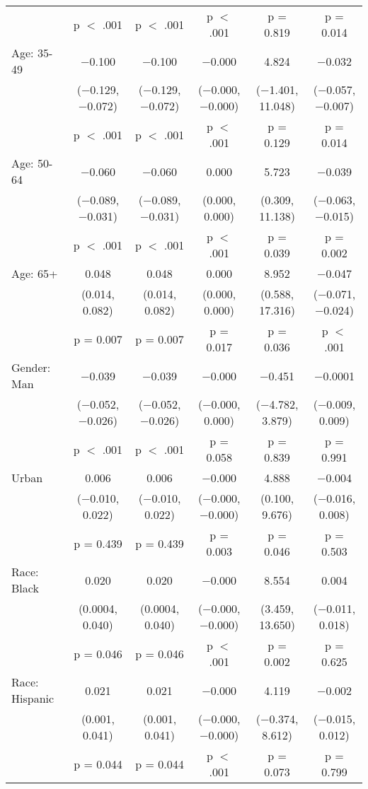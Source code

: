 \begin{tabular}{@{\extracolsep{5pt}}lccccc}
  & p $<$ .001 & p $<$ .001 & p $<$ .001 & p = 0.819 & p = 0.014 \\ 
  Age: 35\mbox{-}49 & $-$0.100 & $-$0.100 & $-$0.000 & 4.824 & $-$0.032 \\ 
  & ($-$0.129, $-$0.072) & ($-$0.129, $-$0.072) & ($-$0.000, $-$0.000) & ($-$1.401, 11.048) & ($-$0.057, $-$0.007) \\ 
  & p $<$ .001 & p $<$ .001 & p $<$ .001 & p = 0.129 & p = 0.014 \\ 
  Age: 50\mbox{-}64 & $-$0.060 & $-$0.060 & 0.000 & 5.723 & $-$0.039 \\ 
  & ($-$0.089, $-$0.031) & ($-$0.089, $-$0.031) & (0.000, 0.000) & (0.309, 11.138) & ($-$0.063, $-$0.015) \\ 
  & p $<$ .001 & p $<$ .001 & p $<$ .001 & p = 0.039 & p = 0.002 \\ 
  Age: 65+ & 0.048 & 0.048 & 0.000 & 8.952 & $-$0.047 \\ 
  & (0.014, 0.082) & (0.014, 0.082) & (0.000, 0.000) & (0.588, 17.316) & ($-$0.071, $-$0.024) \\ 
  & p = 0.007 & p = 0.007 & p = 0.017 & p = 0.036 & p $<$ .001 \\ 
  Gender: Man & $-$0.039 & $-$0.039 & $-$0.000 & $-$0.451 & $-$0.0001 \\ 
  & ($-$0.052, $-$0.026) & ($-$0.052, $-$0.026) & ($-$0.000, 0.000) & ($-$4.782, 3.879) & ($-$0.009, 0.009) \\ 
  & p $<$ .001 & p $<$ .001 & p = 0.058 & p = 0.839 & p = 0.991 \\ 
  Urban & 0.006 & 0.006 & $-$0.000 & 4.888 & $-$0.004 \\ 
  & ($-$0.010, 0.022) & ($-$0.010, 0.022) & ($-$0.000, $-$0.000) & (0.100, 9.676) & ($-$0.016, 0.008) \\ 
  & p = 0.439 & p = 0.439 & p = 0.003 & p = 0.046 & p = 0.503 \\ 
  Race: Black & 0.020 & 0.020 & $-$0.000 & 8.554 & 0.004 \\ 
  & (0.0004, 0.040) & (0.0004, 0.040) & ($-$0.000, $-$0.000) & (3.459, 13.650) & ($-$0.011, 0.018) \\ 
  & p = 0.046 & p = 0.046 & p $<$ .001 & p = 0.002 & p = 0.625 \\ 
  Race: Hispanic & 0.021 & 0.021 & $-$0.000 & 4.119 & $-$0.002 \\ 
  & (0.001, 0.041) & (0.001, 0.041) & ($-$0.000, $-$0.000) & ($-$0.374, 8.612) & ($-$0.015, 0.012) \\ 
  & p = 0.044 & p = 0.044 & p $<$ .001 & p = 0.073 & p = 0.799 \\ 

\end{tabular}
